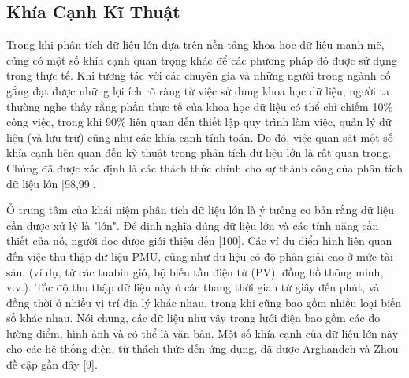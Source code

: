 \documentclass[utf8]{frontiersSCNS} %
\begin{document}
\subsection{Khía Cạnh Kĩ Thuật}
Trong khi phân tích dữ liệu lớn dựa trên nền tảng khoa học dữ liệu mạnh mẽ, cũng có một số khía cạnh quan trọng khác để các phương pháp đó được sử dụng trong thực tế. Khi tương tác với các chuyên gia và những người trong ngành cố gắng đạt được những lợi ích rõ ràng từ việc sử dụng khoa học dữ liệu, người ta thường nghe thấy rằng phần thực tế của khoa học dữ liệu có thể chỉ chiếm 10\% công việc, trong khi 90\% liên quan đến thiết lập quy trình làm việc, quản lý dữ liệu (và lưu trữ) cũng như các khía cạnh tính toán. Do đó, việc quan sát một số khía cạnh liên quan đến kỹ thuật trong phân tích dữ liệu lớn là rất quan trọng. Chúng đã được xác định là các thách thức chính cho sự thành công của phân tích dữ liệu lớn [98,99].

Ở trung tâm của khái niệm phân tích dữ liệu lớn là ý tưởng cơ bản rằng dữ liệu cần được xử lý là "lớn". Để định nghĩa đúng dữ liệu lớn và các tính năng cần thiết của nó, người đọc được giới thiệu đến [100]. Các ví dụ điển hình liên quan đến việc thu thập dữ liệu PMU, cũng như dữ liệu có độ phân giải cao ở mức tài sản, (ví dụ, từ các tuabin gió, bộ biến tần điện từ (PV), đồng hồ thông minh, v.v.). Tốc độ thu thập dữ liệu này ở các thang thời gian từ giây đến phút, và đồng thời ở nhiều vị trí địa lý khác nhau, trong khi cũng bao gồm nhiều loại biến số khác nhau. Nói chung, các dữ liệu như vậy trong lưới điện bao gồm các đo lường điểm, hình ảnh và có thể là văn bản. Một số khía cạnh của dữ liệu lớn này cho các hệ thống điện, từ thách thức đến ứng dụng, đã được Arghandeh và Zhou đề cập gần đây [9].
\end{document}
